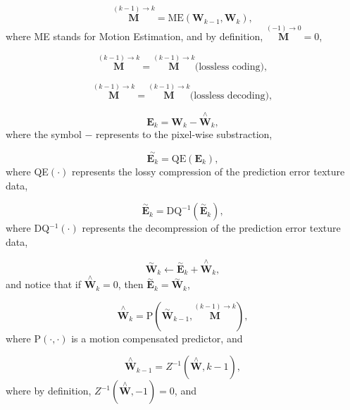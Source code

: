 \begin{equation}
  \overset{(k-1)\rightarrow k}{\mathbf M} = \text{ME}({\mathbf W}_{k-1}, {\mathbf W}_k),
  \tag{c}
\end{equation}
where ME stands for Motion Estimation, and by definition,
$\overset{(-1)\rightarrow 0}{{\mathbf M}}=0$,

\begin{equation}
  \overset{(k-1)\rightarrow k}{\mathbf M} = \overset{(k-1)\rightarrow k}{\mathbf M} \text{(lossless~coding)},
  \tag{d}
\end{equation}

\begin{equation}
  \overset{(k-1)\rightarrow k}{\mathbf M} = \overset{(k-1)\rightarrow k}{\mathbf M} \text{(lossless~decoding)},
  \tag{e}
\end{equation}

\begin{equation}
  {\mathbf E}_k = {\mathbf W}_k - \overset{\wedge}{{\mathbf W}}_k,
  \tag{f}
\end{equation}
where the symbol $-$ represents to the pixel-wise substraction,

\begin{equation}
  \overset{\sim}{{\mathbf E}_k} = \text{QE}({\mathbf E}_k),
  \tag{g}
\end{equation}
where QE$(\cdot)$ represents the lossy compression of the
prediction error texture data,

\begin{equation}
  \overset{\sim}{\mathbf E}_k = \text{DQ}^{-1}(\overset{\sim}{\mathbf E}_k),
  \tag{h}
\end{equation}
where DQ$^{-1}(\cdot)$ represents the decompression of the prediction
error texture data,

\begin{equation}
  \overset{\sim}{\mathbf W}_k \leftarrow \overset{\sim}{\mathbf E}_k + \overset{\wedge}{\mathbf W}_k,
  \tag{i}
\end{equation}
and notice that if $\overset{\wedge}{\mathbf W}_k=0$, then
$\overset{\sim}{\mathbf E}_k = \overset{\sim}{\mathbf W}_k$,

\begin{equation}
  \overset{\wedge}{\mathbf W}_k = \text{P}(\overset{\sim}{\mathbf W}_{k-1}, \overset{(k-1)\rightarrow k}{\mathbf M}),
  \tag{j}
\end{equation}
where P$(\cdot,\cdot)$ is a motion compensated predictor, and

\begin{equation}
   \overset{\wedge}{\mathbf W}_{k-1} = Z^{-1}(\overset{\wedge}{\mathbf W}, k-1),
  \tag{k}
\end{equation}
where by definition, $Z^{-1}(\overset{\wedge}{\mathbf W}, -1) = 0$, and

